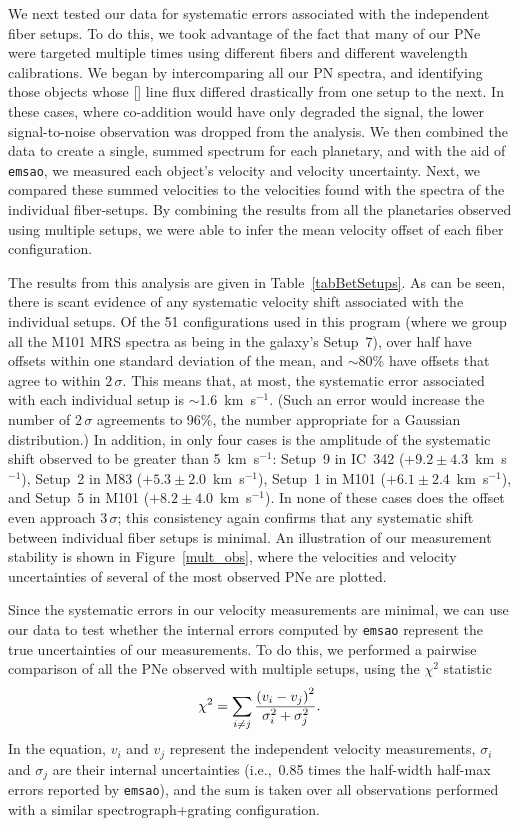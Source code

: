 \documentclass[12pt,preprint]{emulateapj}
\newcommand{\ie}{{i.e.,}}
\newcommand{\kms}{km~s$^{-1}$}
\begin{document}
We next tested our data for systematic errors associated with the independent fiber setups.  To do this, we took advantage of the fact that many of our PNe were targeted multiple times using different fibers and different wavelength calibrations.  We began by intercomparing all our PN spectra, and identifying those objects whose [] line flux differed drastically from one setup to the next.  In these cases, where co-addition would have only degraded the signal, the lower signal-to-noise observation was dropped from the analysis.  We then combined the data to create a single, summed spectrum for each planetary, and with the aid of {\tt emsao}, we measured each object's velocity and velocity uncertainty.  Next, we compared these summed velocities to the velocities found with the spectra of the individual fiber-setups.  By combining the results from all the planetaries observed using multiple setups, we were able to infer the mean velocity offset of each fiber configuration.

The results from this analysis are given in Table~\ref{tabBetSetups}.  As can be seen, there is scant evidence of any systematic velocity shift associated with the individual setups.  Of the 51 configurations used in this program (where we group all the M101 MRS spectra as being in the galaxy's Setup~7), over half have offsets within one standard deviation of the mean, and $\sim$80\% have offsets that agree to within $2 \,\sigma$.  This means that, at most, the systematic error associated with each individual setup is $\sim$1.6~\kms.  (Such an error would increase the number of $2 \, \sigma$ agreements to 96\%, the number appropriate for a Gaussian distribution.)  In addition, in only four cases is the amplitude of the systematic shift observed to be greater than 5~\kms:  Setup~9 in IC~342 ($+9.2 \pm 4.3$~\kms), Setup~2 in M83 ($+5.3 \pm 2.0$~\kms), Setup~1 in M101 ($+6.1 \pm 2.4$~\kms), and Setup~5 in M101 ($+8.2 \pm 4.0$~\kms).  In none of these cases does the offset even approach $3 \, \sigma$; this consistency again confirms that any systematic shift between individual fiber setups is minimal.   An illustration of our measurement stability is shown in Figure~\ref{mult_obs}, where the velocities and velocity uncertainties of several of the most observed PNe are plotted. 

Since the systematic errors in our velocity measurements are minimal, we can use our data to test whether the internal errors computed by {\tt emsao} represent the true uncertainties of our measurements.  To do this, we performed a pairwise comparison of all the PNe observed with multiple setups, using the 
$\chi^2$ statistic
\begin{equation}
\chi^2 = \sum_{i\neq j} {\left(v_i - v_j\right)^2 \over \sigma_i^2 + \sigma_j^2}\label{chi2}.
\end{equation}
In the equation, $v_i$ and $v_j$ represent the independent velocity measurements, $\sigma_i$ and $\sigma_j$ are their internal uncertainties (\ie\ 0.85 times the half-width half-max errors reported by {\tt emsao}), and the sum is taken over all observations performed with a similar spectrograph+grating configuration.
\end{document}

